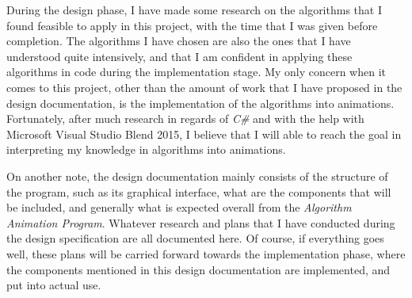 During the design phase, I have made some research on the algorithms that I found feasible to apply in this project, with the time that I was given before completion. The algorithms I have chosen are also the ones that I have understood quite intensively, and that I am confident in applying these algorithms in code during the implementation stage. My only concern when it comes to this project, other than the amount of work that I have proposed in the design documentation, is the implementation of the algorithms into animations. Fortunately, after much research in regards of \textit{C\#} and with the help with Microsoft Visual Studio Blend 2015, I believe that I will able to reach the goal in interpreting my knowledge in algorithms into animations.

On another note, the design documentation mainly consists of the structure of the program, such as its graphical interface, what are the components that will be included, and generally what is expected overall from the \textit{Algorithm Animation Program}. Whatever research and plans that I have conducted during the design specification are all documented here. Of course, if everything goes well, these plans will be carried forward towards the implementation phase, where the components mentioned in this design documentation are implemented, and put into actual use. 